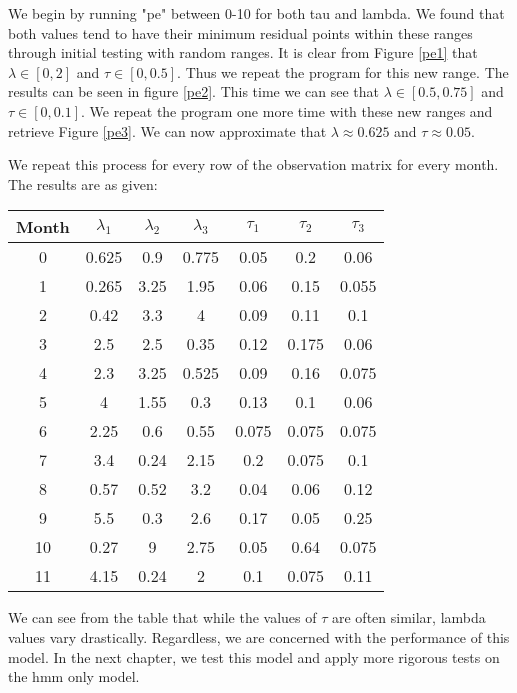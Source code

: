     We begin by running "pe" between 0-10 for both tau and lambda. We found that both values tend to have their minimum residual points within these ranges through initial testing with random ranges. It is clear from Figure \ref{pe1} that $\lambda \in [0,2]$ and $\tau \in [0,0.5]$. Thus we repeat the program for this new range. The results can be seen in figure \ref{pe2}. This time we can see that $\lambda \in [0.5,0.75]$ and $\tau \in [0,0.1]$. We repeat the program one more time with these new ranges and retrieve Figure \ref{pe3}. We can now approximate that $\lambda \approx 0.625$ and $\tau \approx 0.05$. 

    We repeat this process for every row of the observation matrix for every month. The results are as given:

    \begin{center}
        \begin{tabular}{c | c | c | c | c | c | c}
            \label{petable}
            Month   &   $\lambda_1$ &   $\lambda_2$ &   $\lambda_3$ &   $\tau_1$    &   $\tau_2$    &   $\tau_3$   \\
            \hline
                0   &   0.625       &   0.9         &   0.775       &   0.05    &   0.2     &   0.06    \\
                1   &   0.265       &   3.25        &   1.95        &   0.06    &   0.15    &   0.055   \\
                2   &   0.42        &   3.3         &   4           &   0.09    &   0.11    &   0.1     \\
                3   &   2.5         &   2.5         &   0.35        &   0.12    &   0.175   &   0.06    \\
                4   &   2.3         &   3.25        &   0.525       &   0.09    &   0.16    &   0.075   \\
                5   &   4           &   1.55        &   0.3         &   0.13    &   0.1     &   0.06    \\
                6   &   2.25        &   0.6         &   0.55        &   0.075   &   0.075   &   0.075   \\
                7   &   3.4         &   0.24        &   2.15        &   0.2     &   0.075   &   0.1     \\
                8   &   0.57        &   0.52        &   3.2         &   0.04    &   0.06    &   0.12    \\
                9   &   5.5         &   0.3         &   2.6         &   0.17    &   0.05    &   0.25    \\
                10  &   0.27        &   9           &   2.75        &   0.05    &   0.64    &   0.075   \\
                11  &   4.15        &   0.24        &   2           &   0.1     &   0.075   &   0.11    

        \end{tabular}
    \end{center}

    We can see from the table that while the values of $\tau$ are often similar, lambda values vary drastically. Regardless, we are concerned with the performance of this model. In the next chapter, we test this model and apply more rigorous tests on the hmm only model.





